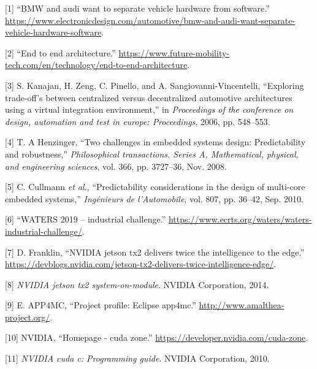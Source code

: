 \documentclass[
  12pt,
  a4paperpaper,
]{report}
\begin{document}
\hypertarget{refs}{}
\leavevmode\hypertarget{ref-Hansen2019}{}%
{[}1{]} ``BMW and audi want to separate vehicle hardware from
software.''
\url{https://www.electronicdesign.com/automotive/bmw-and-audi-want-separate-vehicle-hardware-software}.

\leavevmode\hypertarget{ref-Future2019}{}%
{[}2{]} ``End to end architecture.''
\url{https://www.future-mobility-tech.com/en/technology/end-to-end-architecture}.

\leavevmode\hypertarget{ref-Kanajan2006}{}%
{[}3{]} S. Kanajan, H. Zeng, C. Pinello, and A. Sangiovanni-Vincentelli,
``Exploring trade-off's between centralized versus decentralized
automotive architectures using a virtual integration environment,'' in
\emph{Proceedings of the conference on design, automation and test in
europe: Proceedings}, 2006, pp. 548--553.

\leavevmode\hypertarget{ref-Henzinger2008}{}%
{[}4{]} T. A Henzinger, ``Two challenges in embedded systems design:
Predictability and robustness,'' \emph{Philosophical transactions.
Series A, Mathematical, physical, and engineering sciences}, vol. 366,
pp. 3727--36, Nov. 2008.

\leavevmode\hypertarget{ref-Cullmann2010}{}%
{[}5{]} C. Cullmann \emph{et al.}, ``Predictability considerations in
the design of multi-core embedded systems,'' \emph{Ingénieurs de
l'Automobile}, vol. 807, pp. 36--42, Sep. 2010.

\leavevmode\hypertarget{ref-Water2019Url}{}%
{[}6{]} ``WATERS 2019 -- industrial challenge.''
\url{https://www.ecrts.org/waters/waters-industrial-challenge/}.

\leavevmode\hypertarget{ref-TX2Intro2017}{}%
{[}7{]} D. Franklin, ``NVIDIA jetson tx2 delivers twice the intelligence
to the edge.''
\url{https://devblogs.nvidia.com/jetson-tx2-delivers-twice-intelligence-edge/}.

\leavevmode\hypertarget{ref-TX2Datasheet2014}{}%
{[}8{]} \emph{NVIDIA jetson tx2 system-on-module}. NVIDIA Corporation,
2014.

\leavevmode\hypertarget{ref-Amalthea2019}{}%
{[}9{]} E. APP4MC, ``Project profile: Eclipse app4mc.''
\url{http://www.amalthea-project.org/}.

\leavevmode\hypertarget{ref-CUDAZONE2019}{}%
{[}10{]} NVIDIA, ``Homepage - cuda zone.''
\url{https://developer.nvidia.com/cuda-zone}.

\leavevmode\hypertarget{ref-CCUDA2010}{}%
{[}11{]} \emph{NVIDIA cuda c: Programming guide}. NVIDIA Corporation,
2010.
\end{document}

